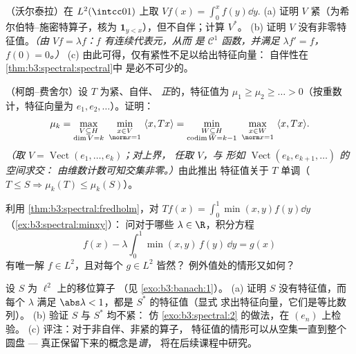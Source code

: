 \begin{exercise}[$\star\star$]\label{exo:b3:spectral:7}
（沃尔泰拉）在 $L^2(\intcc01)$ 上取 $Vf(x) = \int_0^xf(y)\dd
y$.
(a) 证明 $V$ 紧（为希尔伯特–施密特算子，核为 $\mathbf
1_{y < x}$），但不自伴；计算 $V^*$。
(b) 证明 $V$ 没有非零特征值。\emph{（由 $Vf =
\lambda f$：$f$ 有连续代表元，从而
是 $\mathcal C^1$ 函数，并满足 $\lambda f' = f$，$f(0) = 0$。）}
(c) 由此可得，仅有紧性不足以给出特征向量：
自伴性在\cref{thm:b3:spectral:spectral}中
是必不可少的。
\end{exercise}

\begin{exercise}[$\star\star\star$]\label{exo:b3:spectral:8}
（柯朗–费舍尔）设 $T$ 为紧、自伴、
\emph{正}的，特征值为 $\mu_1 \geq \mu_2 \geq \dots
> 0$（按重数计，特征向量为 $e_1, e_2,
\dots$）。证明：
\[
\mu_{k} = \max_{\substack{V \subseteq H \\ \dim V = k}}\
\min_{\substack{x \in V\\ \norm x = 1}}\ \langle x, Tx\rangle
= \min_{\substack{W \subseteq H\\ \operatorname{codim}W =
k-1}}\ \max_{\substack{x\in W\\ \norm x = 1}}\ \langle x,
Tx\rangle .
\]
\emph{（取 $V = \operatorname{Vect}(e_1,\dots,e_k)$；对上界，
任取 $V$，与
形如 $\operatorname{Vect}(e_k, e_{k+1}, \dots)$ 的空间求交：
由维数计数可知交集非零。）}由此推出
特征值关于 $T$ 单调（$T \leq S
\Rightarrow \mu_k(T) \leq \mu_k(S)$）。
\end{exercise}

\begin{exercise}[$\star\star$]\label{exo:b3:spectral:9}
利用 \cref{thm:b3:spectral:fredholm}，对 $Tf(x) =
\int_0^1\min(x,y)f(y)\dd y$（\cref{ex:b3:spectral:minxy}）：
问对于哪些 $\lambda \in \R$，积分方程
\[
f(x) - \lambda\int_0^1\min(x,y)\,f(y)\,\dd y = g(x)
\]
有唯一解 $f \in L^2$，且对每个 $g \in L^2$ 皆然？
例外值处的情形又如何？
\end{exercise}

\begin{exercise}[$\star\star\star$]\label{exo:b3:spectral:10}
设 $S$ 为 $\ell^2$ 上的移位算子
（见 \cref{exo:b3:banach:1}）。
(a) 证明 $S$ 没有特征值，而每个 $\lambda$
满足 $\abs\lambda < 1$，都是 $S^*$ 的特征值（显式
求出特征向量，它们是等比数列）。
(b) 验证 $S$ 与 $S^*$ 均不紧：
仿 \cref{exo:b3:spectral:2} 的做法，在 $(e_n)$ 上检验。
(c) 评注：对于非自伴、非紧的算子，
特征值的情形可以从空集一直到整个
圆盘 --- 真正保留下来的概念是\emph{谱}，
将在后续课程中研究。
\end{exercise}


